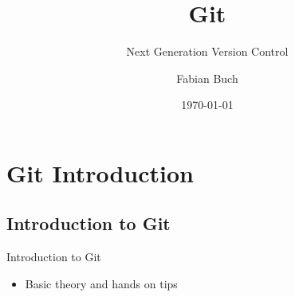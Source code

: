 \documentclass{beamer}
\title[] %
{Git}
\subtitle
{Next Generation Version Control}
\author[] %
{Fabian Buch}
\institute[] %
{Synyx GmbH \& Co. KG}
\date[] %
{\today}
\begin{document}



\begin{frame}
  \titlepage
\end{frame}







\section{Git Introduction}

\subsection{Introduction to Git}\label{sub:einleitung}




\begin{frame}{Introduction to Git}
  \begin{itemize}
  \item
    Basic theory and hands on tips
  \end{itemize}
\end{frame}
\end{document}
